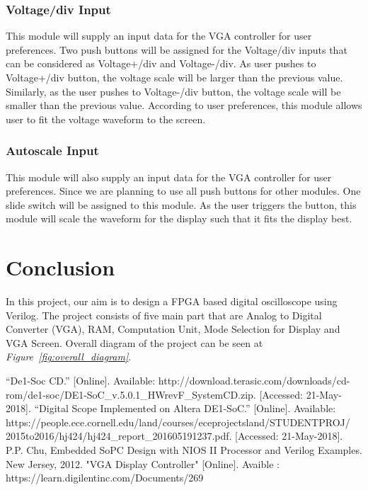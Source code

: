 \documentclass[paper]{IEEEtran}
\begin{document}
\vfill	 
	  
\subsubsection{Voltage/div Input} \- \indent

	This module will supply an input data for the VGA controller for user preferences. Two push buttons will be assigned for the Voltage/div inputs that can be considered as Voltage+/div and Voltage-/div. As user pushes to Voltage+/div button, the voltage scale will be larger than the previous value. Similarly, as the user pushes to Voltage-/div button, the voltage scale will be smaller than the previous value. According to user preferences, this module allows user to fit the voltage waveform to the screen.
	
\subsubsection{Autoscale Input} \- \indent

	This module will also supply an input data for the VGA controller for user preferences. Since we are planning to use all push buttons for other modules. One slide switch will be assigned to this module. As the user triggers the button, this module will scale the waveform for the display such that it fits the display best.

	
	
\section{Conclusion}
\- \indent
	In this project, our aim is to design a FPGA based digital oscilloscope using Verilog. The project consists of five main part that are Analog to Digital Converter (VGA), RAM, Computation Unit, Mode Selection for Display and VGA Screen. Overall diagram of the project can be seen at \textit{Figure~\ref{fig:overall_diagram}}. 
	
	

\begin{thebibliography}{00}
 “De1-Soc CD.” [Online]. Available: http://download.terasic.com/downloads/cd-rom/de1-soc/DE1-SoC\_v.5.0.1\_HWrevF\_SystemCD.zip. [Accessed: 21-May-2018].
 “Digital Scope Implemented on Altera DE1-SoC.” [Online]. Available: https://people.ece.cornell.edu/land/courses/eceprojectsland/STUDENTPROJ/\\2015to2016/hj424/hj424\_report\_201605191237.pdf. [Accessed: 21-May-2018].
 P.P. Chu, Embedded SoPC Design with NIOS II Processor and Verilog Examples. New Jersey, 2012.
 "VGA Display Controller" [Online]. Avaible : https://learn.digilentinc.com/Documents/269
\end{thebibliography}
\end{document}
